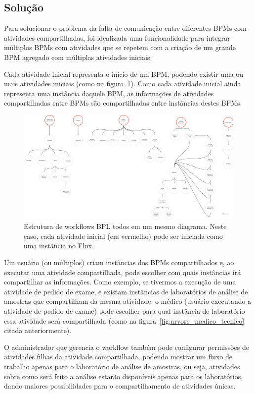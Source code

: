 \subsection{Solução}

Para solucionar o problema da falta de comunicação entre diferentes BPMs com atividades compartilhadas, foi idealizada uma funcionalidade para integrar múltiplos BPMs com atividades que se repetem com a criação de um grande BPM agregado com múltiplas atividades iniciais.

Cada atividade inicial representa o início de um BPM, podendo existir uma ou mais atividades iniciais (como na figura~\ref{fig:bpl_completo}).
Como cada atividade inicial ainda representa uma instância daquele BPM, as informações de atividades compartilhadas entre BPMs são compartilhadas entre instâncias destes BPMs.

\begin{figure}
    \centering
    \includegraphics[width=1\textwidth]{imgs/BPL/bpl_completo.png}
    \caption{Estrutura de workflows BPL todos em um mesmo diagrama. Neste caso, cada atividade inicial (em vermelho) pode ser iniciada como uma instância no Flux.}
    \label{fig:bpl_completo}
\end{figure}

Um usuário (ou múltiplos) criam instâncias dos BPMs compartilhados e, ao executar uma atividade compartilhada, pode escolher com quais instâncias irá compartilhar as informações.
Como exemplo, se tivermos a execução de uma atividade de pedido de exame, e existam instâncias de laboratórios de análise de amostras que compartilham da mesma atividade, o médico (usuário executando a atividade de pedido de exame) pode escolher para qual instância de laboratório essa atividade será compartilhada (como na figura~\ref{fig:arvore_medico_tecnico} citada anteriormente).

O administrador que gerencia o workflow também pode configurar permissões de atividades filhas da atividade compartilhada, podendo mostrar um fluxo de trabalho apenas para o laboratório de análise de amostras, ou seja, atividades sobre como será feito a análise estarão disponíveis apenas para os laboratórios, dando maiores possibilidades para o compartilhamento de atividades únicas.

